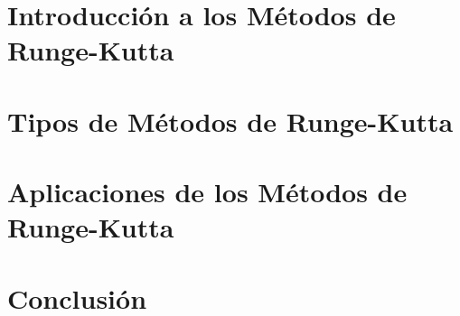 \documentclass[12pt, a4paper]{article}
\begin{document}
\sffamily


\tableofcontents
\newpage

\section{Introducción a los Métodos de Runge-Kutta}

\section{Tipos de Métodos de Runge-Kutta}

\section{Aplicaciones de los Métodos de Runge-Kutta}

\section{Conclusión}
\end{document}
